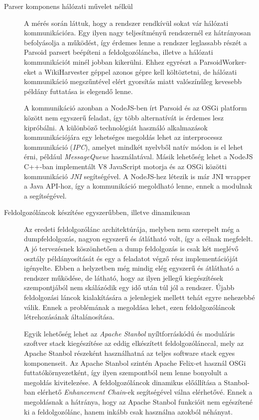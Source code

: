 \begin{description}
	\item[Parser komponens hálózati művelet nélkül]

A mérés során láttuk, hogy a rendszer rendkívül sokat vár hálózati kommunikációra. Egy ilyen nagy teljesítményű rendszernél ez hátrányosan befolyásolja a működést, így érdemes lenne a rendszer leglassabb részét a Parsoid parsert beépíteni a feldolgozóláncba, illetve a hálózati kommunikációt minél jobban kikerülni. Ehhez egyrészt a ParsoidWorker-eket a WikiHarvester géppel azonos gépre kell költöztetni, de hálózati kommunikáció megszűntével elért gyorsítás miatt valószínűleg kevesebb példány futtatása is elegendő lenne.

A kommunikáció azonban a NodeJS-ben írt Parsoid és az OSGi platform között nem egyszerű feladat, így több alternatívát is érdemes lesz kipróbálni. A különböző technológiát használó alkalmazások kommunikációjára egy lehetséges megoldás lehet az interprocessz kommunikáció (\textit{IPC}), amelyet mindkét nyelvből natív módon is el lehet érni, például \textit{MessageQueue} használatával. Másik lehetőség lehet a NodeJS C++-ban implementált V8 JavaScript motorja és az OSGi közötti kommunikáció \textit{JNI} segítségével. A NodeJS-hez létezik is már JNI wrapper a Java API-hoz, így a kommunikáció megoldható lenne, ennek a modulnak a segítségével.

    \item[Feldolgozóláncok készítése egyszerűbben, illetve dinamikusan]

Az eredeti feldolgozólánc architektúrája, melyben nem szerepelt még a dumpfeldolgozás, nagyon egyszerű és átlátható volt, így a célnak megfelelt. A jó tervezésnek köszönhetően a dump feldolgozás is csak két meglévő osztály példányosítását és egy a feladatot végző rész implementációját igényelte. Ebben a helyzetben még mindig elég egyszerű és átlátható a rendszer működése, de látható, hogy az ilyen jellegű kiegészítések szempontjából nem skálázódik egy idő után túl jól a rendszer. Újabb feldolgozási láncok kialakítására a jelenlegiek mellett tehát egyre nehezebbé válik. Ennek a problémának a megoldása lehet, ezen feldolgozóláncok létrehozásának általánosítása.
    
Egyik lehetőség lehet az \textit{Apache Stanbol} \cite{stanbol} nyíltforráskódú és moduláris szoftver stack kiegészítése az eddig elkészített feldolgozólánccal, mely az Apache Stanbol részeként használhatná az teljes software stack egyes komponenseit. Az Apache Stanbol szintén Apache Felix-et használ OSGi futtatókörnyezetként, így ilyen szempontból nem lenne bonyolult a megoldás kivitelezése. A feldolgozóláncok dinamikus előállítása a Stanbol-ban elérhető \textit{Enhancement Chain}-ek segítségével válna elérhetővé. Ennek a megoldásnak a hátránya, hogy az Apache Stanbol funkcióit nem egészítené ki a feldolgozólánc, hanem inkább csak használna azokból néhányat.
    

\end{description}
